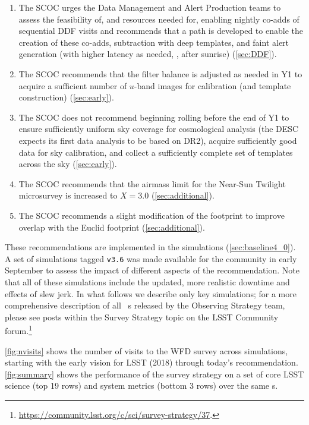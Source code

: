 \begin{enumerate}
\item The SCOC urges the Data Management and Alert Production teams to assess the feasibility of, and resources needed for, enabling nightly co-adds of sequential DDF visits and recommends that a path is developed to enable the creation of these co-adds, subtraction with deep templates, and faint alert generation (with higher latency as needed, \eg , after sunrise) (\autoref{sec:DDF}). 

\item The SCOC recommends that the filter balance is adjusted as needed in Y1 to acquire a sufficient number of $u$-band images for calibration (and template construction) (\autoref{sec:early}). 

\item The SCOC does not recommend beginning rolling before the end of Y1 to ensure sufficiently uniform sky coverage for cosmological analysis (the DESC expects its first data analysis to be based on DR2), acquire sufficiently good data for sky calibration, and collect a 
 sufficiently complete set of templates across the sky (\autoref{sec:early}).

\item The SCOC recommends that the airmass limit for the Near-Sun Twilight microsurvey is increased to $X=3.0$ (\autoref{sec:additional}).

\item The SCOC recommends a slight modification of the  footprint to improve overlap with the Euclid footprint (\autoref{sec:additional}). 

\end{enumerate}

These recommendations are implemented in the  simulations (\autoref{sec:baseline4_0}). A set of simulations tagged \texttt{v3.6} was made available for the community in early September to assess the impact of different aspects of the recommendation. Note that all of these simulations include the updated, more realistic downtime and effects of slew jerk. In what follows we describe only key simulations; for a more comprehensive description of all \opsim\ s released by the Observing Strategy team, please see posts within the Survey Strategy topic on the LSST Community forum.\footnote{\url{https://community.lsst.org/c/sci/survey-strategy/37}.}

 \autoref{fig:nvisits} shows the number of visits to the WFD survey across simulations, starting with the early vision for LSST (2018) through today's recommendation. \autoref{fig:summary} shows the performance of the survey strategy on a set of core LSST science (top 19 rows) and system metrics (bottom 3 rows) over the same \opsim s. 
 
